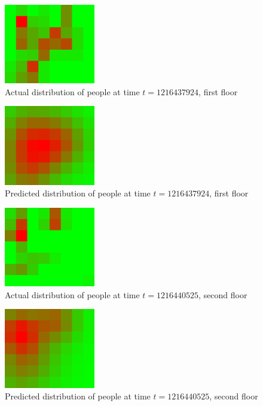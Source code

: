\documentclass[letterpaper]{article}
\begin{document}
\begin{figure}[h!]
  \centering
    \includegraphics[width=150px,natwidth=320,natheight=280]{selected_renders/0_1216437924.png}
  \caption{Actual distribution of people at time $t=1216437924$, first floor}
  \label{fig:t1dist}
\end{figure}

\begin{figure}[h!]
  \centering
    \includegraphics[width=150px,natwidth=320,natheight=280]{selected_renders/0_1216437924p.png}
  \caption{Predicted distribution of people at time $t=1216437924$, first floor}
  \label{fig:t2dist}
\end{figure}

\begin{figure}[h!]
  \centering
    \includegraphics[width=150px,natwidth=320,natheight=280]{selected_renders/1_1216440525.png}
  \caption{Actual distribution of people at time $t=1216440525$, second floor}
  \label{fig:t3dist}
\end{figure}

\begin{figure}[h!]
  \centering
    \includegraphics[width=150px,natwidth=320,natheight=280]{selected_renders/1_1216440525p.png}
  \caption{Predicted distribution of people at time $t=1216440525$, second floor}
  \label{fig:t4dist}
\end{figure}
\end{document}
